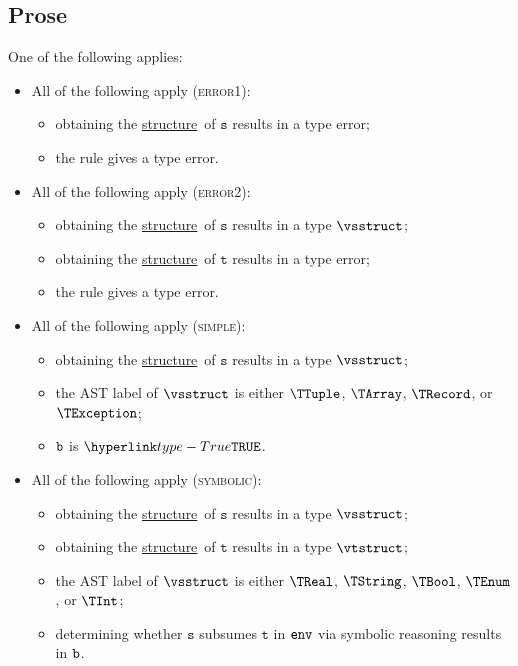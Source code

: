 \documentclass{book}
\newcommand\structure[0]{\hyperlink{def-structure}{structure}}
\newcommand\vt[0]{\texttt{t}}
\newcommand\vs[0]{\texttt{s}}
\begin{document}
\subsection{Prose}
One of the following applies:
\begin{itemize}
  \item All of the following apply (\textsc{error1}):
  \begin{itemize}
    \item obtaining the \structure\ of $\vs$ results in a type error;
    \item the rule gives a type error.
  \end{itemize}

  \item All of the following apply (\textsc{error2}):
  \begin{itemize}
    \item obtaining the \structure\ of $\vs$ results in a type $\vsstruct$;
    \item obtaining the \structure\ of $\vt$ results in a type error;
    \item the rule gives a type error.
  \end{itemize}

  \item All of the following apply (\textsc{simple}):
  \begin{itemize}
    \item obtaining the \structure\ of $\vs$ results in a type $\vsstruct$;
    \item the AST label of $\vsstruct$ is either $\TTuple$, $\TArray$, $\TRecord$, or $\TException$;
    \item $\texttt{b}$ is $\True$.
  \end{itemize}

  \item All of the following apply (\textsc{symbolic}):
  \begin{itemize}
    \item obtaining the \structure\ of $\vs$ results in a type $\vsstruct$;
    \item obtaining the \structure\ of $\vt$ results in a type $\vtstruct$;
    \item the AST label of $\vsstruct$ is either $\TReal$, $\TString$, $\TBool$, $\TEnum$, or $\TInt$;
    \item determining whether $\vs$ subsumes $\vt$ in $\texttt{env}$ via symbolic reasoning results in $\texttt{b}$.
  \end{itemize}
\end{itemize}
\end{document}
